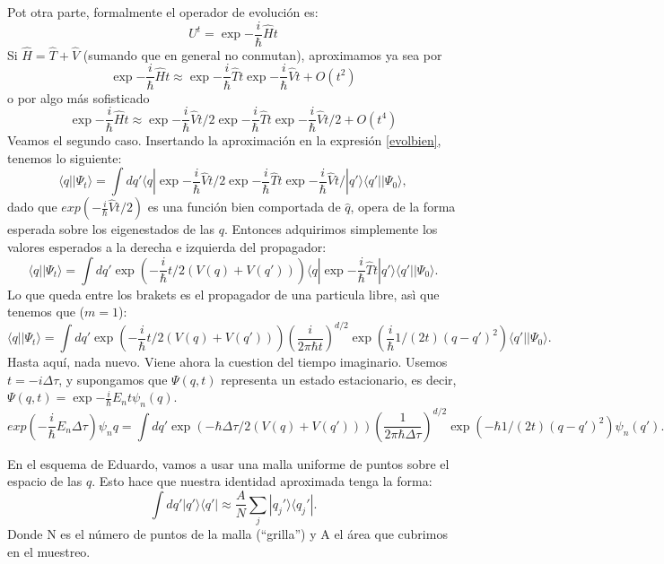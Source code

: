 \documentclass[a4paper,12pt]{article}
\newcommand{\dt}{\Delta\tau}
\newcommand{\ihb}{\frac{i}{\hbar}}
\newcommand{\bra}[1]{\langle #1|}
\newcommand{\ket}[1]{|#1\rangle}
\begin{document}
Pot otra parte, formalmente el operador de evolución es:
\begin{equation}
U^t=\exp{-\ihb \hat{H} t} 
\end{equation}
Si $\hat{H}=\hat{T}+\hat{V}$ (sumando que  en general no conmutan),
aproximamos ya sea por 
\begin{equation}\label{aproxHernando}
\exp{-\ihb \hat{H} t}\approx 
 \exp{-\ihb \hat{T} t}\exp{-\ihb \hat{V}t}+O(t^2)
\end{equation}
o por algo más sofisticado
\begin{equation}\label{aproxEduardo}
\exp{-\ihb \hat{H} t}\approx
 \exp{-\ihb \hat{V}t/2}\exp{-\ihb \hat{T} t}\exp{-\ihb \hat{V}t/2}+O(t^4)
\end{equation}
Veamos el segundo caso. Insertando la aproximación en la expresión 
\ref{evolbien}, tenemos lo siguiente:
\begin{equation}\label{ketaprox1}
\bra{q}\ket{\Psi_t}  = \int dq' \bra{q} 
\exp{-\ihb \hat{V}t/2}\exp{-\ihb \hat{T} t}\exp{-\ihb \hat{V}t/} 
\ket{q'}\bra{q'}\ket{\Psi_0},
\end{equation}
dado que $exp(-\ihb \hat{V}t/2)$ es una función bien comportada de $\hat{q}$,
opera de la forma esperada sobre los eigenestados de las $q$. Entonces adquirimos
simplemente los valores esperados a la derecha e izquierda del propagador:
\begin{equation}\label{ketaprox2}
  \bra{q}\ket{\Psi_t}  = \int dq' \exp(-\ihb t/2 (V(q)+V(q'))) 
  \bra{q} \exp{-\ihb \hat{T} t}\ket{q'}\bra{q'}\ket{\Psi_0}.
\end{equation}
Lo que queda entre los brakets es el propagador de una particula
libre, asì que tenemos que ($m=1$):
\begin{equation}\label{ketaprox2}
  \bra{q}\ket{\Psi_t}  = \int dq' \exp(-\ihb t/2 (V(q)+V(q'))) 
  (\frac{ i }{2\pi\hbar t})^{d/2} \exp(\ihb 1/(2t) (q-q')^2)
  \bra{q'}\ket{\Psi_0}.
\end{equation}
Hasta aquí, nada nuevo. Viene ahora la cuestion del tiempo
imaginario. Usemos $t=-i\dt$, y supongamos que
$\Psi(q,t)$ representa un estado estacionario, es decir, 
$\Psi(q,t)=\exp{-\ihb E_n t}\psi_n(q)$.
\begin{equation}\label{ketaprox2}
  exp(-\ihb E_n \dt) \psi_n{q}  = \int dq' \exp(-\hbar \dt/2 (V(q)+V(q'))) 
  (\frac{1}{2\pi\hbar \dt})^{d/2} \exp(- \hbar 1/(2t) (q-q')^2)
  \psi_n(q').
\end{equation}

En el esquema de 
Eduardo, vamos a usar una malla uniforme de puntos sobre el
espacio de las $q$. Esto hace que nuestra identidad aproximada
tenga la forma:
\begin{equation}
\int dq' \ket{q'}\bra{q'}\approx \frac{A}{N}\sum_j \ket{q_j'}\bra{q_j'}.
\end{equation}
Donde N es el número de puntos de la malla (``grilla'') y A el área
que cubrimos en el muestreo. 
\end{document}
